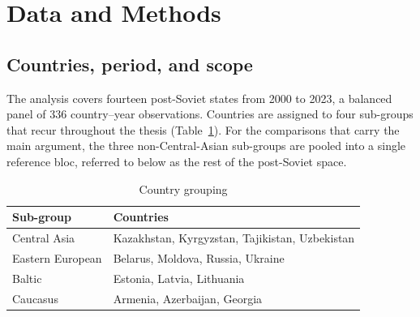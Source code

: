 %

\section{Data and Methods}
\label{sec:data-methods}

\subsection{Countries, period, and scope}
\label{sec:scope}

The analysis covers fourteen post-Soviet states from 2000 to 2023, a balanced panel of 336 country--year observations. Countries are assigned to four sub-groups that recur throughout the thesis (Table~\ref{tab:grouping}). For the comparisons that carry the main argument, the three non-Central-Asian sub-groups are pooled into a single reference bloc, referred to below as the rest of the post-Soviet space.

\begin{table}[htbp]
\centering
\caption{Country grouping}
\label{tab:grouping}
\small
\begin{tabular}{ll}
\toprule
Sub-group & Countries \\
\midrule
Central Asia & Kazakhstan, Kyrgyzstan, Tajikistan, Uzbekistan \\
Eastern European & Belarus, Moldova, Russia, Ukraine \\
Baltic & Estonia, Latvia, Lithuania \\
Caucasus & Armenia, Azerbaijan, Georgia \\
\bottomrule
\end{tabular}
\end{table}

